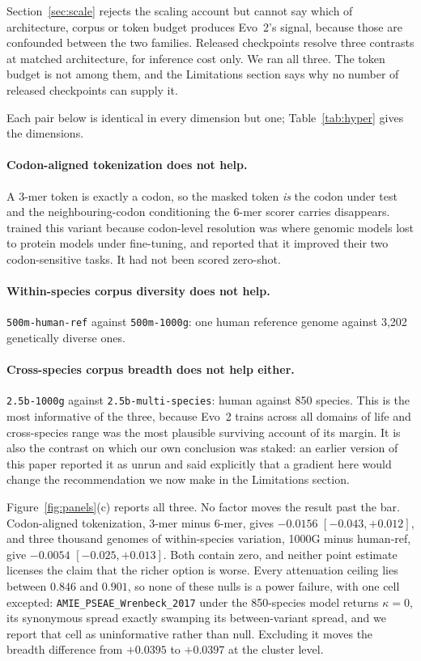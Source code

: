 \documentclass[11pt]{article}
\begin{document}
Section~\ref{sec:scale} rejects the scaling account but cannot say which of
architecture, corpus or token budget produces Evo~2's signal, because those are
confounded between the two families. Released checkpoints resolve three contrasts at
matched architecture, for inference cost only. We ran all three. The token budget is
not among them, and the Limitations section says why no number of
released checkpoints can supply it.

Each pair below is identical in every dimension but one; Table~\ref{tab:hyper}
gives the dimensions.

\paragraph{Codon-aligned tokenization does not help.} A 3-mer token is exactly a
codon, so the masked token \emph{is} the codon under test and the
neighbouring-codon conditioning the 6-mer scorer carries disappears.
\citet{boshar2024glm} trained this variant because codon-level resolution was where
genomic models lost to protein models under fine-tuning, and reported that it
improved their two codon-sensitive tasks. It had not been scored zero-shot.

\paragraph{Within-species corpus diversity does not help.} \texttt{500m-human-ref}
against \texttt{500m-1000g}: one human reference genome against 3,202 genetically
diverse ones.

\paragraph{Cross-species corpus breadth does not help either.}
\texttt{2.5b-1000g} against \texttt{2.5b-multi-species}: human against 850 species.
This is the most informative of the three, because Evo~2 trains across all domains
of life and cross-species range was the most plausible surviving account of its
margin. It is also the contrast on which our own conclusion was staked: an earlier
version of this paper reported it as unrun and said explicitly that a gradient here
would change the recommendation we now make in the Limitations section.

Figure~\ref{fig:panels}(c) reports all three. No factor moves the result past the bar.
Codon-aligned tokenization, 3-mer minus 6-mer, gives $-0.0156$ $[-0.043,+0.012]$,
and three thousand genomes of within-species variation, 1000G minus human-ref, give
$-0.0054$ $[-0.025,+0.013]$. Both contain zero, and neither point estimate licenses
the claim that the richer option is worse. Every attenuation ceiling lies between
$0.846$ and $0.901$, so none of these nulls is a power failure, with one cell
excepted: \texttt{AMIE\_PSEAE\_Wrenbeck\_2017} under the 850-species model returns
$\kappa=0$, its synonymous spread exactly swamping its between-variant spread, and we
report that cell as uninformative rather than null. Excluding it moves the breadth
difference from $+0.0395$ to $+0.0397$ at the cluster level.
\end{document}
